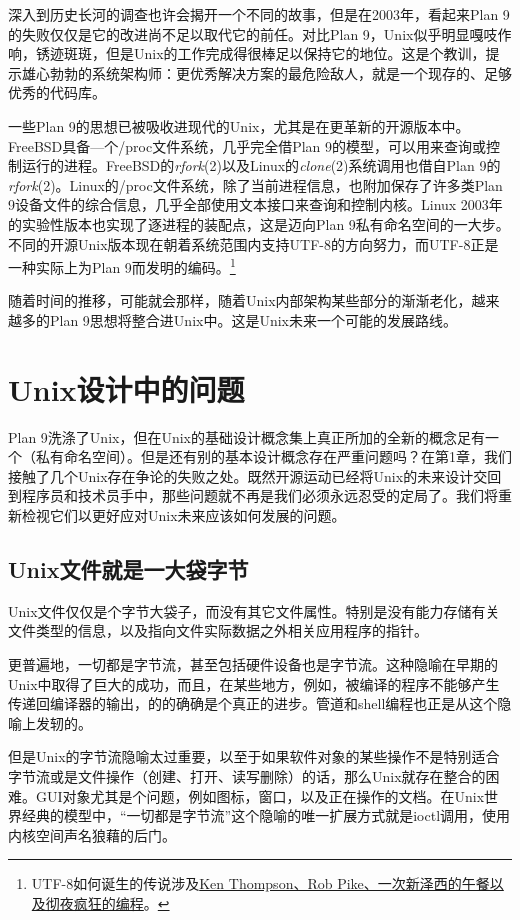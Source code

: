 \documentclass[12pt,oneside]{book}
\begin{document}
深入到历史长河的调查也许会揭开一个不同的故事，但是在2003年，看起来Plan 9的失败仅仅是它的改进尚不足以取代它的前任。对比Plan 9，Unix似乎明显嘎吱作响，锈迹斑斑，但是Unix的工作完成得很棒足以保持它的地位。这是个教训，提示雄心勃勃的系统架构师：更优秀解决方案的最危险敌人，就是一个现存的、足够优秀的代码库。

一些Plan 9的思想已被吸收进现代的Unix，尤其是在更革新的开源版本中。FreeBSD具备—个/proc文件系统，几乎完全借Plan 9的模型，可以用来查询或控制运行的进程。FreeBSD的\textit{rfork}(2)以及Linux的\textit{clone}(2)系统调用也借自Plan 9的\textit{rfork}(2)。Linux的/proc文件系统，除了当前进程信息，也附加保存了许多类Plan 9设备文件的综合信息，几乎全部使用文本接口来查询和控制内核。Linux 2003年的实验性版本也实现了逐进程的装配点，这是迈向Plan 9私有命名空间的一大步。不同的开源Unix版本现在朝着系统范围内支持UTF-8的方向努力，而UTF-8正是一种实际上为Plan 9而发明的编码。\footnote{UTF-8如何诞生的传说涉及\href{http://www.cl.cam.ac.uk/~mgk25/ucs/utf-8-history.txt}{Ken Thompson、Rob Pike、一次新泽西的午餐以及彻夜疯狂的编程}。}

随着时间的推移，可能就会那样，随着Unix内部架构某些部分的渐渐老化，越来越多的Plan 9思想将整合进Unix中。这是Unix未来一个可能的发展路线。

\section{Unix设计中的问题}
Plan 9洗涤了Unix，但在Unix的基础设计概念集上真正所加的全新的概念足有一个（私有命名空间）。但是还有别的基本设计概念存在严重问题吗？在第1章，我们接触了几个Unix存在争论的失败之处。既然开源运动已经将Unix的未来设计交回到程序员和技术员手中，那些问题就不再是我们必须永远忍受的定局了。我们将重新检视它们以更好应对Unix未来应该如何发展的问题。

\subsection{Unix文件就是一大袋字节}
Unix文件仅仅是个字节大袋子，而没有其它文件属性。特别是没有能力存储有关文件类型的信息，以及指向文件实际数据之外相关应用程序的指针。

更普遍地，一切都是字节流，甚至包括硬件设备也是字节流。这种隐喻在早期的Unix中取得了巨大的成功，而且，在某些地方，例如，被编译的程序不能够产生传递回编译器的输出，的的确确是个真正的进步。管道和shell编程也正是从这个隐喻上发轫的。

但是Unix的字节流隐喻太过重要，以至于如果软件对象的某些操作不是特别适合字节流或是文件操作（创建、打开、读写删除）的话，那么Unix就存在整合的困难。GUI对象尤其是个问题，例如图标，窗口，以及正在操作的文档。在Unix世界经典的模型中，“一切都是字节流”这个隐喻的唯一扩展方式就是ioctl调用，使用内核空间声名狼藉的后门。
\end{document}
